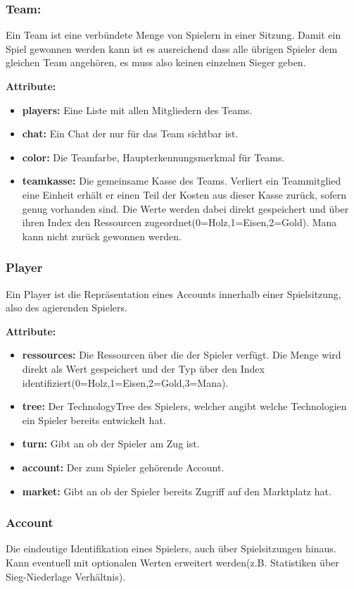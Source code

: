 \documentclass[fontsize=12pt,paper=a4,twoside]{scrartcl}
\begin{document}
\subsubsection{Team:}

Ein Team ist eine verbündete Menge von Spielern in einer Sitzung. Damit ein Spiel gewonnen werden kann ist es ausreichend dass alle übrigen Spieler dem gleichen Team angehören, es muss also keinen einzelnen Sieger geben.

\textbf{Attribute:}
\begin{itemize}
\item \textbf{players:} Eine Liste mit allen Mitgliedern des Teams.
\item \textbf{chat:} Ein Chat der nur für das Team sichtbar ist.
\item \textbf{color:} Die Teamfarbe, Haupterkennungsmerkmal für Teams.
\item \textbf{teamkasse:} Die gemeinsame Kasse des Teams. Verliert ein Teammitglied eine Einheit erhält er einen Teil der Kosten aus dieser Kasse zurück, sofern genug vorhanden sind. Die Werte werden dabei direkt gespeichert und über ihren Index den Ressourcen zugeordnet(0=Holz,1=Eisen,2=Gold). Mana kann nicht zurück gewonnen werden.
\end{itemize}

\subsubsection{Player}
Ein Player ist die Repräsentation eines Accounts innerhalb einer Spielsitzung, also des agierenden Spielers.

\textbf{Attribute:}
\begin{itemize}
\item \textbf{ressources:} Die Ressourcen über die der Spieler verfügt. Die Menge wird direkt als Wert gespeichert und der Typ über den Index identifiziert(0=Holz,1=Eisen,2=Gold,3=Mana).
\item \textbf{tree:} Der TechnologyTree des Spielers, welcher angibt welche Technologien ein Spieler bereits entwickelt hat.
\item \textbf{turn:} Gibt an ob der Spieler am Zug ist.
\item \textbf{account:} Der zum Spieler gehörende Account.
\item \textbf{market:} Gibt an ob der Spieler bereits Zugriff auf den Marktplatz hat.
\end{itemize}

\subsubsection{Account}
Die eindeutige Identifikation eines Spielers, auch über Spielsitzungen hinaus. Kann eventuell mit optionalen Werten erweitert werden(z.B. Statistiken über Sieg-Niederlage Verhältnis).
\end{document}
